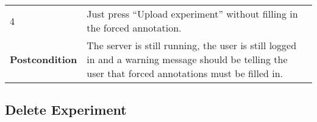 \begin{longtable}[c]{@{}ll@{}}
\begin{minipage}[t]{0.31\columnwidth}
4
\strut\end{minipage} &
\begin{minipage}[t]{0.63\columnwidth}\raggedright\strut
Just press ``Upload experiment'' without filling in the forced
annotation.
\strut\end{minipage}\tabularnewline
\begin{minipage}[t]{0.31\columnwidth}\raggedright\strut
\textbf{Postcondition}
\strut\end{minipage} &
\begin{minipage}[t]{0.63\columnwidth}\raggedright\strut
The server is still running, the user is still logged in and a warning
message should be telling the user that forced annotations must be
filled in.
\strut\end{minipage}\tabularnewline
\bottomrule
\end{longtable}

\pagebreak

\subsection{Delete Experiment}\label{delete-experiment}

